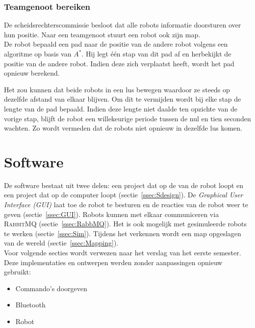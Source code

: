 \documentclass[eind]{penoverslag}
\begin{document}
\subsubsection{Teamgenoot bereiken}
\label{sssec:AlgoTeam}

De scheidsrechterscommissie besloot dat alle robots informatie doorsturen over hun positie. Naar een teamgenoot stuurt een robot ook zijn map.\\

De robot bepaald een pad naar de positie van de andere robot volgens een algoritme op basis van $A^{*}$. Hij legt \'e\'en stap van dit pad af en herbekijkt de positie van de andere robot. Indien deze zich verplaatst heeft, wordt het pad opnieuw berekend.

Het zou kunnen dat beide robots in een lus bewegen waardoor ze steeds op dezelfde afstand van elkaar blijven. Om dit te vermijden wordt bij elke stap de lengte van de pad bepaald. Indien deze lengte niet daalde ten opzichte van de vorige stap, blijft de robot een willekeurige periode tussen de nul en tien seconden wachten. Zo wordt vermeden dat de robots niet opnieuw in dezelfde lus komen.


\section{Software}
\label{sec:Softw}
De software bestaat uit twee delen: een project dat op de  van de robot loopt en een project dat op de computer loopt (sectie~\ref{ssec:Sdesign}). De \textit{Graphical User Interface (GUI)} laat toe de robot te besturen en de reacties van de robot weer te geven (sectie~\ref{ssec:GUI}). Robots kunnen met elkaar communiceren via \textsc{RabbitMQ} (sectie~\ref{ssec:RabbMQ}). Het is ook mogelijk met gesimuleerde robots te werken (sectie~\ref{ssec:Sim}). Tijdens het verkennen wordt een map opgeslagen van de wereld (sectie~\ref{ssec:Mapping}).\\

Voor volgende secties wordt verwezen naar het verslag van het eerste semester. Deze implementaties en ontwerpen werden zonder aanpassingen opnieuw gebruikt:

\begin{itemize}
\item Commando's doorgeven
\item Bluetooth
\item Robot
\end{itemize}
\end{document}
